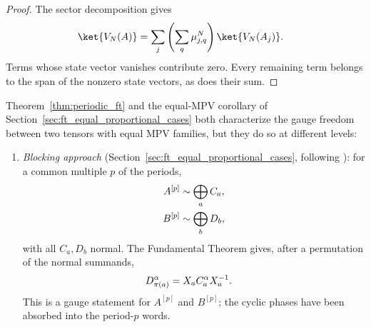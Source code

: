 \begin{proof}\leanok
    The sector decomposition gives
    \begin{align}
        \ket{V_N(A)}
         & =\sum_j\left(\sum_q\mu_{j,q}^{N}\right)\ket{V_N(A_j)}.
        \label{eq:periodic_nonzero_span}
    \end{align}
    Terms whose state vector vanishes contribute zero. Every remaining term
    belongs to the span of the nonzero state vectors, as does their sum.
\end{proof}

\begin{remark}\notready
    \label{rem:periodic_vs_blocking_ft}
    Theorem~\ref{thm:periodic_ft} and the equal-MPV corollary
    of Section~\ref{sec:ft_equal_proportional_cases} both characterize the gauge freedom
    between two tensors with equal MPV families, but they do so at
    different levels:

    \begin{enumerate}
        \item \emph{Blocking approach} (Section~\ref{sec:ft_equal_proportional_cases},
              following \cite{Cirac2016MPDO_arXiv}):
              for a common multiple $p$ of the periods,
              \begin{align}
                  A^{[p]} & \sim\bigoplus_a C_a,
                  \notag                         \\
                  B^{[p]} & \sim\bigoplus_b D_b,
                  \notag
              \end{align}
              with all $C_a,D_b$ normal. The Fundamental Theorem gives, after a
              permutation of the normal summands,
              \begin{align}
                  D_{\pi(a)}^\alpha
                   & =
                  X_a C_a^\alpha X_a^{-1}.
                  \notag
              \end{align}
              This is a gauge statement for $A^{[p]}$ and $B^{[p]}$; the cyclic
              phases have been absorbed into the period-$p$ words.


\end{enumerate}
\end{remark}
